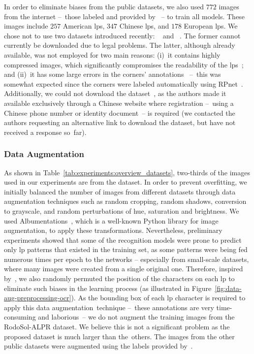 In order to eliminate biases from the public datasets, we also used $772$ images from the internet --~those labeled and provided by \cite{laroca2021efficient}~-- to train all models.
These images include $257$ American \glspl*{lp}, $347$ Chinese \glspl*{lp}, and $178$ European \glspl*{lp}.
We chose not to use two datasets introduced recently: \karplate~\citep{henry2020multinational} and \ccpd~\citep{xu2018towards}.
The former cannot currently be downloaded due to legal problems.
The latter, although already available, was not employed for two main reasons: (i)~it contains highly compressed images, which significantly compromises the readability of the \glspl*{lp}~\citep{silva2022flexible};
and (ii)~it has some large errors in the corners' annotations~\citep{meng2020accelerating} --~this was somewhat expected since the corners were labeled automatically using RPnet~\citep{xu2018towards}. 
Additionally, we could not download the \clpd dataset~\citep{zhang2021robust_attentional}, as the authors made it available exclusively through a Chinese website where registration --~using a Chinese phone number or identity document~-- is required (we contacted the authors requesting an alternative link to download the dataset, but have not received a response so~far).

\subsubsection{Data Augmentation}

As shown in Table~\ref{tab:experiments:overview_datasets}, two-thirds of the images used in our experiments are from the \dataset dataset.
In order to prevent overfitting, we initially balanced the number of images from different datasets through data augmentation techniques such as random cropping, random shadows, conversion to grayscale, and random perturbations of hue, saturation and brightness.
We used Albumentations~\citep{albumentations}, which is a well-known Python library for image augmentation, to apply these transformations.
Nevertheless, preliminary experiments showed that some of the recognition models were prone to predict only \gls*{lp} patterns that existed in the training set, as some patterns were being fed numerous times per epoch to the networks -- especially from small-scale datasets, where many images were created from a single original one.
Therefore, inspired by~\cite{goncalves2018realtime}, we also randomly permuted the position of the characters on each \gls*{lp} to eliminate such biases in the learning process (as illustrated in Figure~\ref{fig:data-aug-preprocessing-ocr}).
As the bounding box of each \gls*{lp} character is required to apply this data augmentation~technique --~these annotations are very time-consuming and laborious~-- we do not augment the training images from the RodoSol-ALPR dataset.
We believe this is not a significant problem as the proposed dataset is much larger than the~others.
The images from the other public datasets were augmented using the labels provided by~\cite{laroca2021efficient}.

